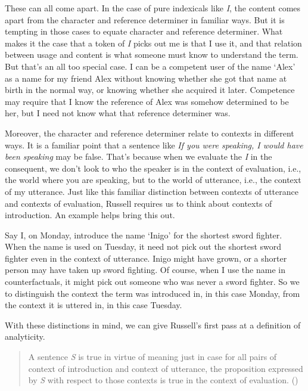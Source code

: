 \documentclass[
  11pt,
  letterpaper,
  DIV=11,
  numbers=noendperiod,
  twoside]{scrartcl}
\begin{document}
These can all come apart. In the case of pure indexicals like \emph{I},
the content comes apart from the character and reference determiner in
familiar ways. But it is tempting in those cases to equate character and
reference determiner. What makes it the case that a token of \emph{I}
picks out me is that I use it, and that relation between usage and
content is what someone must know to understand the term. But that's an
all too special case. I can be a competent user of the name `Alex' as a
name for my friend Alex without knowing whether she got that name at
birth in the normal way, or knowing whether she acquired it later.
Competence may require that I know the reference of Alex was somehow
determined to be her, but I need not know what that reference determiner
was.

Moreover, the character and reference determiner relate to contexts in
different ways. It is a familiar point that a sentence like \emph{If you
were speaking, I would have been speaking} may be false. That's because
when we evaluate the \emph{I} in the consequent, we don't look to who
the speaker is in the context of evaluation, i.e., the world where you
are speaking, but to the world of utterance, i.e., the context of my
utterance. Just like this familiar distinction between contexts of
utterance and contexts of evaluation, Russell requires us to think about
contexts of introduction. An example helps bring this out.

Say I, on Monday, introduce the name `Inigo' for the shortest sword
fighter. When the name is used on Tuesday, it need not pick out the
shortest sword fighter even in the context of utterance. Inigo might
have grown, or a shorter person may have taken up sword fighting. Of
course, when I use the name in counterfactuals, it might pick out
someone who was never a sword fighter. So we to distinguish the context
the term was introduced in, in this case Monday, from the context it is
uttered in, in this case Tuesday.

With these distinctions in mind, we can give Russell's first pass at a
definition of analyticity.

\begin{quote}
A sentence \emph{S} is true in virtue of meaning just in case for all
pairs of context of introduction and context of utterance, the
proposition expressed by \emph{S} with respect to those contexts is true
in the context of evaluation. ()
\end{quote}
\end{document}
